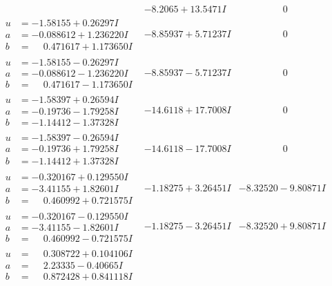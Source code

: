 \documentclass[1p]{elsarticle_modified}
\theoremstyle{definition}
\begin{document}
$$\begin{array}{c|c|c}
 & -8.2065 + 13.5471 I & \phantom{-0.000000 } 0 \\ \hline\begin{aligned}
u &= -1.58155 + 0.26297 I \\
a &= -0.088612 + 1.236220 I \\
b &= \phantom{-}0.471617 + 1.173650 I\end{aligned}
 & -8.85937 + 5.71237 I & \phantom{-0.000000 } 0 \\ \hline\begin{aligned}
u &= -1.58155 - 0.26297 I \\
a &= -0.088612 - 1.236220 I \\
b &= \phantom{-}0.471617 - 1.173650 I\end{aligned}
 & -8.85937 - 5.71237 I & \phantom{-0.000000 } 0 \\ \hline\begin{aligned}
u &= -1.58397 + 0.26594 I \\
a &= -0.19736 - 1.79258 I \\
b &= -1.14412 - 1.37328 I\end{aligned}
 & -14.6118 + 17.7008 I & \phantom{-0.000000 } 0 \\ \hline\begin{aligned}
u &= -1.58397 - 0.26594 I \\
a &= -0.19736 + 1.79258 I \\
b &= -1.14412 + 1.37328 I\end{aligned}
 & -14.6118 - 17.7008 I & \phantom{-0.000000 } 0 \\ \hline\begin{aligned}
u &= -0.320167 + 0.129550 I \\
a &= -3.41155 + 1.82601 I \\
b &= \phantom{-}0.460992 + 0.721575 I\end{aligned}
 & -1.18275 + 3.26451 I & -8.32520 - 9.80871 I \\ \hline\begin{aligned}
u &= -0.320167 - 0.129550 I \\
a &= -3.41155 - 1.82601 I \\
b &= \phantom{-}0.460992 - 0.721575 I\end{aligned}
 & -1.18275 - 3.26451 I & -8.32520 + 9.80871 I \\ \hline\begin{aligned}
u &= \phantom{-}0.308722 + 0.104106 I \\
a &= \phantom{-}2.23335 - 0.40665 I \\
b &= \phantom{-}0.872428 + 0.841118 I\end{aligned}

\end{array}$$
\end{document}
